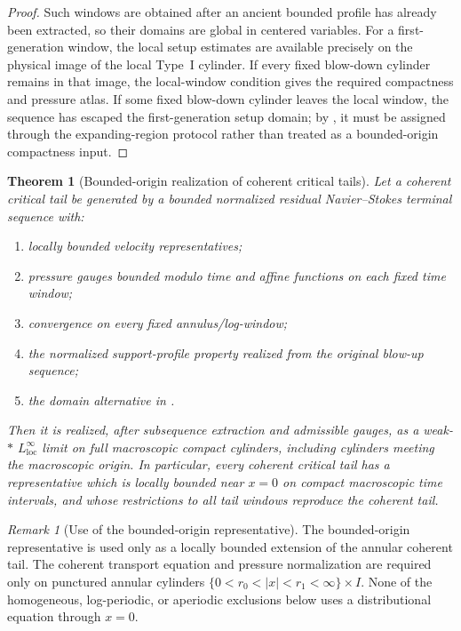 \documentclass[11pt]{amsart}
\numberwithin{equation}{section}
\theoremstyle{plain}
\newtheorem{theorem}{Theorem}[section]
\theoremstyle{definition}
\theoremstyle{remark}
\newtheorem{remark}[remark]{Remark}
\newcommand{\loc}{\mathrm{loc}}
\begin{document}
\begin{proof}
Such windows are obtained after an ancient bounded profile has already
been extracted, so their domains are global in centered variables.  For a
first-generation window, the local setup estimates are available precisely on
the physical image of the local Type~I cylinder.  If every fixed blow-down
cylinder remains in that image, the local-window condition gives the required
compactness and pressure atlas.  If some fixed blow-down cylinder leaves the
local window, the sequence has escaped the first-generation setup domain; by
, it must be assigned through the
expanding-region protocol rather than treated as a bounded-origin compactness
input.
\end{proof}

\begin{theorem}[Bounded-origin realization of coherent critical tails]
\label{thm:bounded-origin-realization-coherent-tails}
Let a coherent critical tail be generated by a bounded normalized residual
Navier--Stokes terminal sequence with:
\begin{enumerate}[label=\textup{(\roman*)}]
   \item locally bounded velocity representatives;
   \item pressure gauges bounded modulo time and affine functions on each fixed
   time window;
   \item convergence on every fixed annulus/log-window;
   \item the normalized support-profile property realized from the original blow-up sequence;
   \item the domain alternative in
   .
\end{enumerate}
Then it is realized, after subsequence extraction and admissible gauges, as a
weak-\(*\) \(L^\infty_{\loc}\) limit on full macroscopic compact cylinders,
including cylinders meeting the macroscopic origin.  In particular, every
coherent critical tail has a representative which is locally bounded near
\(x=0\) on compact macroscopic time intervals, and whose restrictions to all
tail windows reproduce the coherent tail.
\end{theorem}

\begin{remark}[Use of the bounded-origin representative]
\label{rem:bounded-origin-used-only-as-extension}
The bounded-origin representative is used only as a locally bounded extension
of the annular coherent tail.  The coherent transport equation and pressure
normalization are required only on punctured annular cylinders
\(\{0<r_0<|x|<r_1<\infty\}\times I\).  None of the homogeneous,
log-periodic, or aperiodic exclusions below uses a distributional equation
through \(x=0\).
\end{remark}
\end{document}
